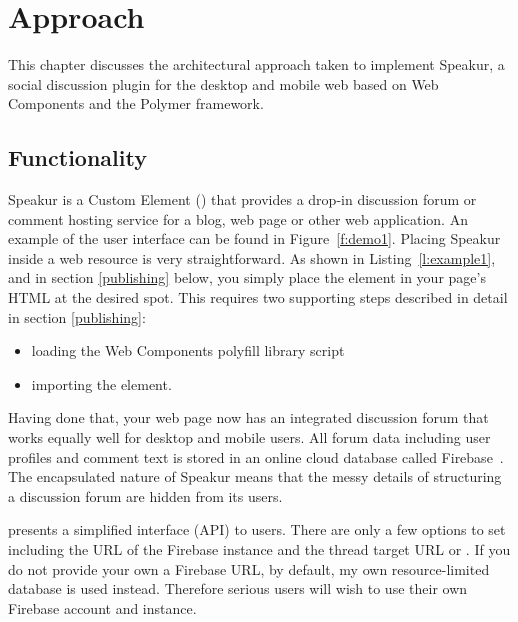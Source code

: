 \chapter{Approach}
%

This chapter discusses the architectural approach taken to implement Speakur, 
a social discussion plugin for the desktop and mobile web based on Web Components and the Polymer framework.

\section{Functionality}
Speakur 
is a Custom Element 
() 
that provides a drop-in discussion forum or comment hosting service for a blog, web page or other web application.
An example of the user interface can be found in Figure~\ref{f:demo1}.
Placing Speakur inside a web resource is very straightforward.
As shown in Listing~\ref{l:example1},
and in section \ref{publishing} below,
you simply place the 
 element in your page's HTML at the desired spot.
This requires two supporting steps described in detail in section \ref{publishing}:
\begin{itemize}
\item loading the Web Components polyfill library script
\item importing the  element.
\end{itemize}

Having done that, your web page now has an integrated discussion forum that works equally well for desktop and mobile users. 
All forum data including user profiles and comment text is stored in an online cloud database called Firebase~\cite{firebasecontributors2015}.
The encapsulated nature of Speakur means that the messy details of structuring a discussion forum are hidden from its users.

 presents a simplified interface (API) to users.
There are only a few options to set including the URL of the Firebase instance and the thread target URL or .
If you do not provide your own a Firebase URL, by default, my own resource-limited database is used instead.
Therefore serious users will wish to use their own Firebase account and instance.

